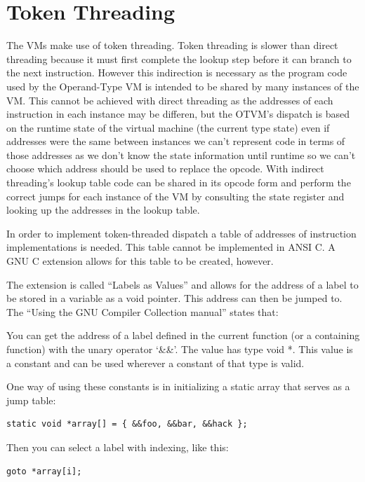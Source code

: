 \documentclass[english,a4paper,12pt]{report}
\begin{document}
\section{Token Threading}
\label{token-threading}
The VMs make use of token threading. Token threading is slower than
direct threading \cite{Shi2007} because it must first complete the
lookup step before it can branch to the next instruction. However this
indirection is necessary as the program code used by the Operand-Type
VM is intended to be shared by many instances of the VM. This cannot
be achieved with direct threading as the addresses of each instruction
in each instance may be differen, but the OTVM's dispatch is
based on the runtime state of the virtual machine (the current type
state) even if addresses were the same between instances we can't
represent code in terms of those addresses as we don't know the state
information until runtime so we can't choose which address should be
used to replace the opcode. With indirect threading's lookup table
code can be shared in its opcode form and perform the correct jumps
for each instance of the VM by consulting the state register and
looking up the addresses in the lookup table.

In order to implement token-threaded dispatch a table of addresses of
instruction implementations is needed. This table cannot be
implemented in ANSI C. A GNU C extension allows for this table to be
created, however.

The extension is called ``Labels as Values'' and allows for the
address of a label to be stored in a variable as a void pointer. This
address can then be jumped to. The ``Using the GNU Compiler Collection
manual''\cite[page 371]{GCC} states that:

\begin{displayquote}
  You can get the address of a label defined in the current function
  (or a containing function) with the unary operator `\&\&'. The value
  has type void *. This value is a constant and can be used wherever a
  constant of that type is valid.
	
  One way of using these constants is in initializing a static array
  that serves as a jump table:
	\begin{lstlisting}
static void *array[] = { &&foo, &&bar, &&hack };
	\end{lstlisting}
	
	Then you can select a label with indexing, like this:
	\begin{lstlisting}
goto *array[i];	
	\end{lstlisting}
\end{displayquote}
\end{document}
